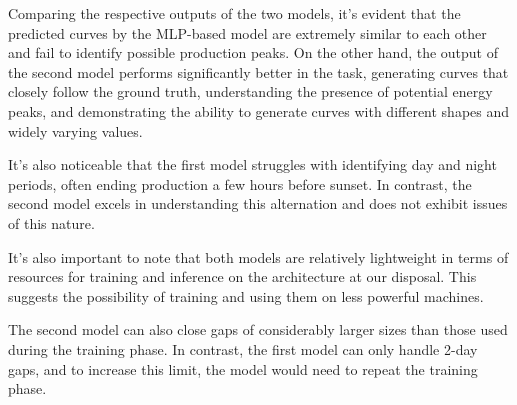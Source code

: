 Comparing the respective outputs of the two models,
it's evident that the predicted curves by the MLP-based model
are extremely similar to each other and fail to identify
possible production peaks.
On the other hand, the output of the second model
performs significantly better in the task, generating curves
that closely follow the ground truth, understanding the
presence of potential energy peaks, and demonstrating the
ability to generate curves with different shapes and widely
varying values.

It's also noticeable that the first model struggles with
identifying day and night periods, often ending production a
few hours before sunset.
In contrast, the second model excels in understanding
this alternation and does not exhibit issues of this nature.

It's also important to note that both models are relatively
lightweight in terms of resources for training and inference
on the architecture at our disposal.
This suggests the possibility of training and using
them on less powerful machines.

The second model can also close gaps of considerably larger
sizes than those used during the training phase.
In contrast, the first model can only handle 2-day gaps,
and to increase this limit, the model would need to repeat
the training phase.



